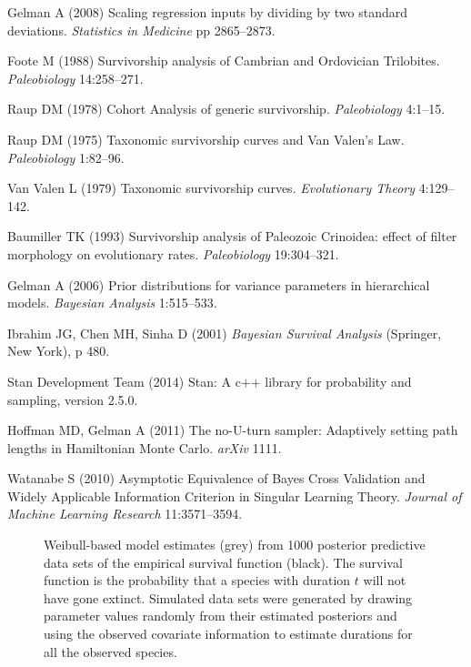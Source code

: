 \documentclass{pnastwo}
\begin{document}
\begin{article}
\begin{thebibliography}{10}
Gelman A
\newblock (2008) {Scaling regression inputs by dividing by two standard
  deviations}.
\newblock \emph{Statistics in Medicine} pp 2865--2873.

Foote M
\newblock (1988) {Survivorship analysis of Cambrian and Ordovician Trilobites}.
\newblock \emph{Paleobiology} 14:258--271.

Raup DM
\newblock (1978) {Cohort Analysis of generic survivorship}.
\newblock \emph{Paleobiology} 4:1--15.

Raup DM
\newblock (1975) {Taxonomic survivorship curves and Van Valen's Law}.
\newblock \emph{Paleobiology} 1:82--96.

{Van Valen} L
\newblock (1979) {Taxonomic survivorship curves}.
\newblock \emph{Evolutionary Theory} 4:129--142.

Baumiller TK
\newblock (1993) {Survivorship analysis of Paleozoic Crinoidea: effect of
  filter morphology on evolutionary rates}.
\newblock \emph{Paleobiology} 19:304--321.

Gelman A
\newblock (2006) {Prior distributions for variance parameters in hierarchical
  models}.
\newblock \emph{Bayesian Analysis} 1:515--533.

Ibrahim JG, Chen MH, Sinha D
\newblock (2001) \emph{{Bayesian Survival Analysis}}
\newblock (Springer, New York), p 480.

{Stan Development Team}
\newblock (2014) Stan: A c++ library for probability and sampling, version
  2.5.0.

Hoffman MD, Gelman A
\newblock (2011) The no-{U}-turn sampler: Adaptively setting path lengths in
  {H}amiltonian {M}onte {C}arlo.
\newblock \emph{arXiv} 1111.

Watanabe S
\newblock (2010) {Asymptotic Equivalence of Bayes Cross Validation and Widely
  Applicable Information Criterion in Singular Learning Theory}.
\newblock \emph{Journal of Machine Learning Research} 11:3571--3594.

\end{thebibliography}



\end{article}



\begin{figure}[ht]
  \centering
  \caption{Weibull-based model estimates (grey) from 1000 posterior predictive data sets of the empirical survival function (black). The survival function is the probability that a species with duration \(t\) will not have gone extinct. Simulated data sets were generated by drawing parameter values randomly from their estimated posteriors and using the observed covariate information to estimate durations for all the observed species.}
  \label{fig:ppc_surv}
\end{figure}
\end{document}
